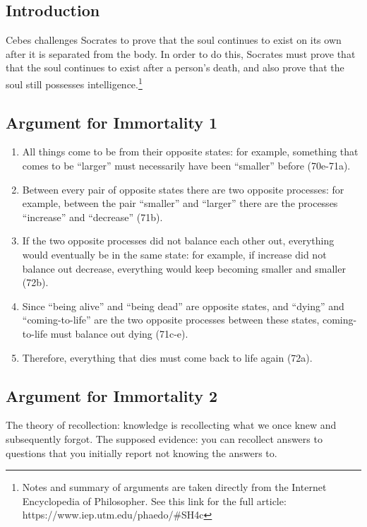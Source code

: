 \documentclass[oneside]{article}
\begin{document}
\thispagestyle{fancy}
\subsection*{Introduction}
Cebes challenges Socrates to prove that the soul continues to exist on its own after it is separated from the body. In order to do this, Socrates must prove that that the soul continues to exist after a person's death, and also prove that the soul still possesses intelligence.\footnote{Notes and summary of arguments are taken directly from the Internet Encyclopedia of Philosopher. See this link for the full article:  https://www.iep.utm.edu/phaedo/#SH4c} 
\subsection*{Argument for Immortality 1}

\begin{enumerate}
\item
  All things come to be from their opposite states: for example,
  something that comes to be ``larger'' must necessarily have been
  ``smaller'' before (70e-71a).
\item
  Between every pair of opposite states there are two opposite
  processes: for example, between the pair ``smaller'' and ``larger''
  there are the processes ``increase'' and ``decrease'' (71b).
\item
  If the two opposite processes did not balance each other out,
  everything would eventually be in the same state: for example, if
  increase did not balance out decrease, everything would keep becoming
  smaller and smaller (72b).
\item
  Since ``being alive'' and ``being dead'' are opposite states, and
  ``dying'' and ``coming-to-life'' are the two opposite processes
  between these states, coming-to-life must balance out dying (71c-e).
\item
  Therefore, everything that dies must come back to life again (72a).
\end{enumerate}

\subsection*{Argument for Immortality 2}
The theory of recollection: knowledge is recollecting what we once knew and subsequently forgot. The supposed evidence: you can recollect answers to questions that you initially report not knowing the answers to. 
\end{document}
